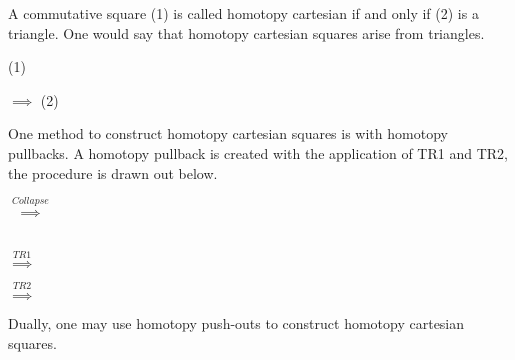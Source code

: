     \begin{definition}
         A commutative square (1) is called homotopy cartesian if and only if (2) is a triangle. One would say that homotopy cartesian squares arise from triangles.
        \begin{center}
            (1)
            $\implies$
            (2)
        \end{center}
    \end{definition}
        
    \begin{remark}
        One method to construct homotopy cartesian squares is with homotopy pullbacks. A homotopy pullback is created with the application of TR1 and TR2, the procedure is drawn out below.
        \begin{center}
            $\stackrel{Collapse}{\implies}$
             \\
            $\stackrel{TR1}{\implies}$
            $\stackrel{TR2}{\implies}$
        \end{center}

        Dually, one may use homotopy push-outs to construct homotopy cartesian squares.
    \end{remark}

